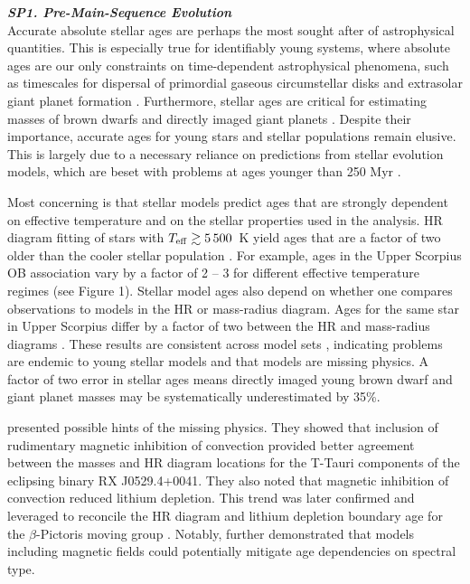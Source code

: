 \documentclass[12pt,a4paper]{article}
\begin{document}
\textbf{\textit{SP1. Pre-Main-Sequence Evolution}} \\
Accurate absolute stellar ages are perhaps the most sought after of astrophysical quantities. This is especially true for identifiably young systems, where absolute ages are our only constraints on time-dependent astrophysical phenomena, such as timescales for dispersal of primordial gaseous circumstellar disks \citep{Haisch2001,Mamajek2009} and extrasolar giant planet formation \citep{Chabrier2014}. Furthermore, stellar ages are critical for estimating  masses of brown dwarfs and directly imaged giant planets \citep{Kalas2008}. Despite their importance, accurate ages for young stars and stellar populations remain elusive. This is largely due to a necessary reliance on predictions from stellar evolution models, which are beset with problems at ages younger than 250 Myr \citep{Soderblom2014,Stassun2014}. 

Most concerning is that stellar models predict ages that are strongly dependent on effective temperature and on the stellar properties used in the analysis. HR diagram fitting of stars with $T_{\rm eff} \gtrsim 5\,500$~K yield ages that are a factor of two older than the cooler stellar population \citep{Naylor2009, Herczeg2015}. For example, ages in the Upper Scorpius OB association vary by a factor of 2 -- 3 for different effective temperature regimes (see Figure 1). Stellar model ages also depend on whether one compares observations to models in the HR or mass-radius diagram. Ages for the same star in Upper Scorpius differ by a factor of two between the HR and mass-radius diagrams \citep{Kraus2015}. These results are consistent across model sets \citep{Herczeg2015}, indicating problems are endemic to young stellar models and that models are missing physics. A factor of two error in stellar ages means directly imaged young brown dwarf and giant planet masses may be systematically underestimated by 35\%. %

\citet{DAntona2000} presented possible hints of the missing physics. They showed that inclusion of rudimentary magnetic inhibition of convection provided better agreement between the masses and HR diagram locations for the T-Tauri components of the eclipsing binary RX J0529.4+0041. They also noted that magnetic inhibition of convection reduced lithium depletion. This trend was later confirmed and leveraged to reconcile the HR diagram and lithium depletion boundary age for the $\beta$-Pictoris moving group \citep{MM10, Malo2014}. Notably, \citet{Malo2014} further demonstrated that models including magnetic fields could potentially mitigate age dependencies on spectral type.
\end{document}
